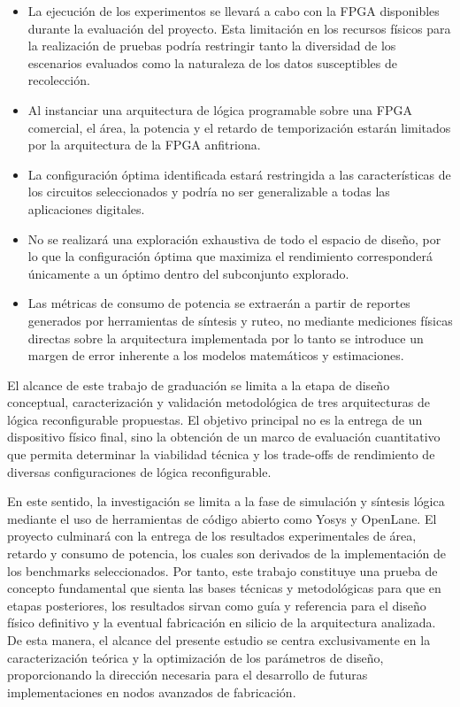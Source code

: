 \begin{itemize}

    \item La ejecución de los experimentos se llevará a cabo con la FPGA 
    disponibles durante la evaluación del proyecto. Esta limitación en los recursos 
    físicos para la realización de pruebas podría restringir tanto la diversidad de 
    los escenarios evaluados como la naturaleza de los datos susceptibles de recolección.

    \item Al instanciar una arquitectura de lógica programable sobre una FPGA comercial, 
    el área, la potencia y el retardo de temporización estarán limitados por la arquitectura 
    de la FPGA anfitriona.

    \item La configuración óptima identificada estará restringida a las características 
    de los circuitos seleccionados y podría no ser generalizable a todas las aplicaciones 
    digitales.

    \item No se realizará una exploración exhaustiva de todo el espacio de diseño, por lo 
    que la configuración óptima que maximiza el rendimiento corresponderá únicamente a un 
    óptimo dentro del subconjunto explorado.

    \item Las métricas de consumo de potencia se extraerán a partir de reportes generados 
    por herramientas de síntesis y ruteo, no mediante mediciones físicas directas sobre 
    la arquitectura implementada por lo tanto se introduce un margen de error inherente a 
    los modelos matemáticos y estimaciones.



\end{itemize}

El alcance de este trabajo de graduación se limita a la etapa de diseño conceptual, 
caracterización y validación metodológica de tres arquitecturas de lógica reconfigurable 
propuestas. El objetivo principal no es la entrega de un dispositivo físico final, sino 
la obtención de un marco de evaluación cuantitativo que permita determinar la viabilidad 
técnica y los trade-offs de rendimiento de diversas configuraciones de lógica reconfigurable.

En este sentido, la investigación se limita a la fase de simulación y síntesis lógica mediante 
el uso de herramientas de código abierto como Yosys y OpenLane. El proyecto culminará con la 
entrega de los resultados experimentales de área, retardo y consumo de potencia, los cuales 
son derivados de la implementación de los benchmarks seleccionados. Por tanto, este trabajo 
constituye una prueba de concepto fundamental que sienta las bases técnicas y metodológicas 
para que en etapas posteriores, los resultados sirvan como guía y referencia para el diseño 
físico definitivo y la eventual fabricación en silicio de la arquitectura analizada. De esta 
manera, el alcance del presente estudio se centra exclusivamente en la caracterización teórica 
y la optimización de los parámetros de diseño, proporcionando la dirección necesaria para el 
desarrollo de futuras implementaciones en nodos avanzados de fabricación.


